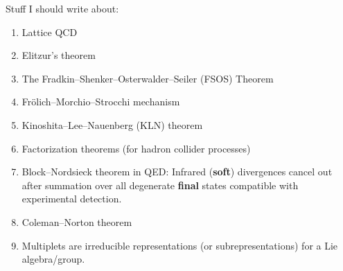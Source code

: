 Stuff I should write about:
\begin{enumerate}
\item Lattice QCD~\cite{Lepage:1998dt}
\item Elitzur's theorem~\cite{Elitzur:1975im}
\item The Fradkin--Shenker--Osterwalder--Seiler (FSOS) Theorem
\item Fr\"{o}lich--Morchio--Strocchi mechanism
\item Kinoshita--Lee--Nauenberg (KLN) theorem
\item Factorization theorems (for hadron collider processes) 
\item Block--Nordsieck theorem in QED: Infrared (\textbf{soft}) divergences
  cancel out after summation over all degenerate \textbf{final} states
  compatible with experimental detection.
\item Coleman--Norton theorem
\item Multiplets are irreducible representations (or subrepresentations)
  for a Lie algebra/group.
\end{enumerate}





